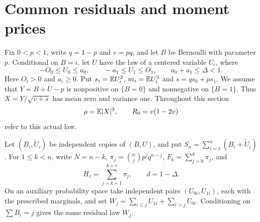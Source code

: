 \section{Common residuals and moment prices}\label{mc:section}

Fix $0<p<1$, write $q=1-p$ and $v=pq$, and let $B$ be
Bernoulli with parameter $p$. Conditional on $B=i$, let $U$ have
the law of a centered variable $U_i$, where
\begin{equation}\label{mc:support}
 -O_0\le U_0\le a_0,\qquad -a_1\le U_1\le O_1,
 \qquad a_0+a_1\le\Delta<1.
\end{equation}
Here $O_i>0$ and $a_i\ge0$. Put $s_i=\mathbb E U_i^2$,
$m_i=\mathbb E U_i^3$ and $s=qs_0+ps_1$. We assume that
$Y=B+U-p$ is nonpositive on $\{B=0\}$ and nonnegative on
$\{B=1\}$. Thus $X=Y/\sqrt{v+s}$ has mean zero and variance one.
Throughout this section
\[
 \rho=\mathbb E|X|^3,\qquad R_0=v(1-2v)
\]
refer to this actual law.

Let $(B_i,\widetilde U_i)$ be independent copies of $(B,U)$, and put
$S_n=\sum_{i=1}^n(B_i+\widetilde U_i)$. For $1\le k<n$,
write $N=n-k$, $\pi_j=\binom njp^jq^{n-j}$,
$F_k=\sum_{j=0}^k\pi_j$, and
\[
 H_r=\sum_{j=k+1}^{k+r}\pi_j,\qquad d=1-\Delta.
\]
On an auxiliary probability space take independent pairs
$(U_{0i},U_{1i})$, each with the prescribed marginals, and set
$W_j=\sum_{i\le j}U_{1i}+\sum_{i>j}U_{0i}$.
Conditioning on $\sum B_i=j$ gives the same residual law $W_j$.

